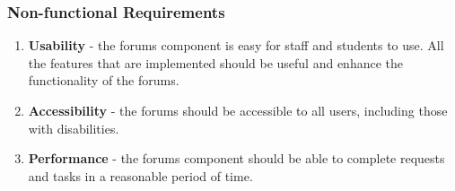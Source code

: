 \subsubsection{Non-functional Requirements}

\begin{enumerate}
    \item \textbf{Usability} -  the forums component is easy for staff and students to use. All the features that are implemented should be useful and enhance the functionality of the forums.
    \item \textbf{Accessibility} - the forums should be accessible to all users, including those with disabilities.
    \item \textbf{Performance} - the forums component should be able to complete requests and tasks in a reasonable period of time.
\end{enumerate}